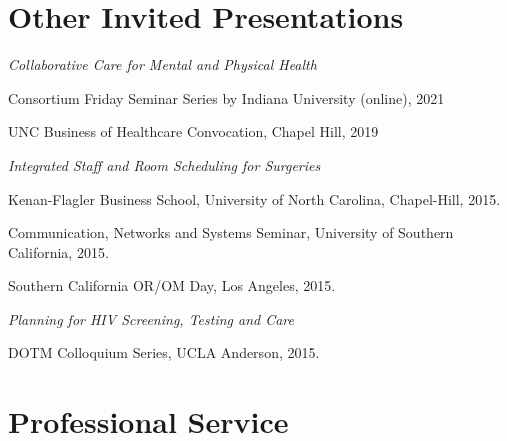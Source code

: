 \documentclass[11pt,a4paper]{article}
\renewenvironment{itemize}{
	\begin{list}{}{
			\setlength{\leftmargin}{1.5em}
		}
	}{
\end{list}
}
\begin{document}
	\section*{\textbf{Other Invited Presentations}}


	\begin{itemize}
		\item \emph{Collaborative Care for Mental and Physical Health}

		\begin{itemize}
			\item Consortium Friday Seminar Series by Indiana University (online), 2021
			\item UNC Business of Healthcare Convocation, Chapel Hill, 2019
		\end{itemize}

		\item\emph{ Integrated Staff and Room Scheduling for Surgeries}
		\begin{itemize}
			\item Kenan-Flagler Business School, University of North Carolina, Chapel-Hill, 2015.
			\item Communication, Networks and Systems Seminar, University of Southern California, 2015.
			\item Southern California OR/OM Day, Los Angeles, 2015.
		\end{itemize}
		\item \emph{Planning for HIV Screening, Testing and Care}
		\begin{itemize}
			\item DOTM Colloquium Series, UCLA Anderson, 2015.
		\end{itemize}
	\end{itemize}



	\section*{\textbf{Professional Service}}
\end{document}
